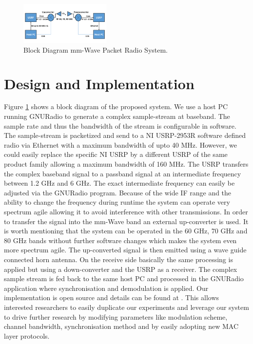 \documentclass{acm_proc_article-sp}
\begin{document}
\begin{figure}
\center
\includegraphics[width=0.4\textwidth]{block-diagram}
\caption{Block Diagram mm-Wave Packet Radio System.}
\label{fig:block}
\end{figure}

\section{Design and Implementation}
Figure \ref{fig:block} shows a block diagram of the proposed system. 
We use a host PC running GNURadio \cite{gnuradio} to generate a complex sample-stream at baseband. The sample rate and thus the bandwidth of the stream is configurable in software. The sample-stream is packetized and send to a NI USRP-2953R \cite{ettus} software defined radio via Ethernet with a maximum bandwidth of upto 40 MHz. However, we could easily replace the specific NI USRP by a different USRP of the same product family allowing a maximum bandwidth of 160 MHz.
The USRP transfers the complex baseband signal to a passband signal at an intermediate frequency between 1.2 GHz and 6 GHz. The exact intermediate frequency can easily be adjusted via the GNURadio program. Because of the wide IF range and the ability to change the frequency during runtime the system can operate very spectrum agile allowing it to avoid interference with other transmissions.
In order to transfer the signal into the mm-Wave band an external up-converter is used. It is worth mentioning that the system can be operated in the 60 GHz, 70 GHz and 80 GHz bands without further software changes which makes the system even more spectrum agile.
The up-converted signal is then emitted using a wave guide connected horn antenna.
On the receive side basically the same processing is applied but using a down-converter and the USRP as a receiver. The complex sample stream is fed back to the same host PC and processed in the GNURadio application where synchronisation and demodulation is applied.
Our implementation is open source and details can be found at \cite{gr-inets}. This allows interested researchers to easily duplicate our experiments and leverage our system to drive further research by modifying parameters like modulation scheme, channel bandwidth, synchronisation method and by easily adopting new MAC layer protocols.
\end{document}
